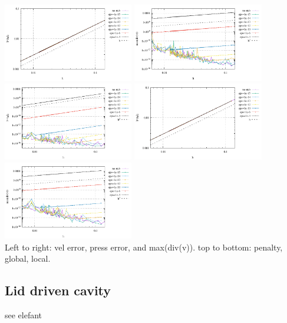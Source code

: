 \begin{center}
\includegraphics[width=5.7cm]{python_codes/fieldstone_115/results/aquarium/errorsP_global.pdf}
\includegraphics[width=5.7cm]{python_codes/fieldstone_115/results/aquarium/divv_global.pdf}\\
\includegraphics[width=5.7cm]{python_codes/fieldstone_115/results/aquarium/errorsV_local.pdf}
\includegraphics[width=5.7cm]{python_codes/fieldstone_115/results/aquarium/errorsP_local.pdf}
\includegraphics[width=5.7cm]{python_codes/fieldstone_115/results/aquarium/divv_local.pdf}\\
{\captionfont Left to right: vel error, press error, and max(div(v)). top to bottom: 
penalty, global, local.}
\end{center}


\newpage
\subsection{Lid driven cavity}

see elefant





